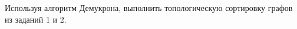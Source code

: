 \question 
Используя алгоритм Демукрона, выполнить топологическую сортировку графов из заданий 1 и 2.
